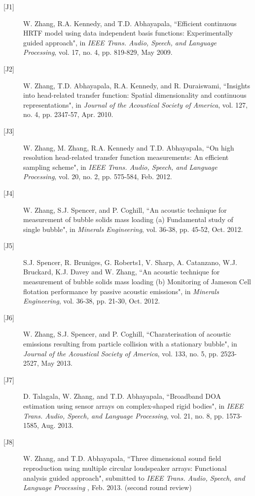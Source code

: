 \documentclass[11pt]{article}
\begin{document}
\begin{description}

\item[{[}J1{]}]W. Zhang, R.A. Kennedy, and T.D. Abhayapala,
``Efficient continuous HRTF model using data independent basis functions: Experimentally guided approach", in {\em
IEEE Trans. Audio, Speech, and Language Processing}, vol. 17, no. 4, pp. 819-829, May 2009.

\item[{[}J2{]}]W. Zhang, T.D. Abhayapala, R.A. Kennedy, and R. Duraiswami,
``Insights into head-related transfer function: Spatial dimensionality and continuous representations",
in \emph{Journal of the Acoustical Society of America}, vol. 127, no. 4, pp. 2347-57, Apr. 2010.

\item[{[}J3{]}]W. Zhang, M. Zhang, R.A. Kennedy and T.D. Abhayapala, ``On high resolution head-related transfer function measurements: An efficient sampling scheme", in \emph{IEEE Trans. Audio, Speech, and Language Processing}, vol. 20, no. 2, pp. 575-584, Feb. 2012.

\item[{[}J4{]}]W. Zhang, S.J. Spencer, and P. Coghill,
``An acoustic technique for measurement of bubble solids mass loading (a) Fundamental study of single bubble", in {\em Minerals Engineering}, vol. 36-38, pp. 45-52, Oct. 2012.

\item[{[}J5{]}]S.J. Spencer, R. Bruniges, G. Roberts1, V. Sharp, A. Catanzano, W.J. Bruckard, K.J. Davey and W. Zhang,
``An acoustic technique for measurement of bubble solids mass loading (b) Monitoring of Jameson Cell flotation performance by passive acoustic emissions", in {\em Minerals Engineering}, vol. 36-38, pp. 21-30, Oct. 2012.

\item[{[}J6{]}]W. Zhang, S.J. Spencer, and P. Coghill,
``Charaterisation of acoustic emissions resulting from particle collision with a stationary bubble", in {\em Journal of the Acoustical Society of America}, vol. 133, no. 5, pp. 2523-2527, May 2013.

\item[{[}J7{]}]D. Talagala, W. Zhang, and T.D. Abhayapala, ``Broadband DOA estimation using sensor arrays on complex-shaped rigid bodies", in {\em IEEE Trans. Audio, Speech, and Language Processing}, vol. 21, no. 8, pp. 1573-1585, Aug. 2013.
    
\item[{[}J8{]}]W. Zhang, and T.D. Abhayapala, ``Three dimensional sound field reproduction using multiple circular loudspeaker arrays: Functional analysis guided approach", submitted to {\em IEEE Trans. Audio, Speech, and Language Processing} , Feb. 2013. (second round review)


\end{description}
\end{document}
